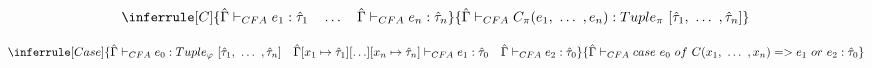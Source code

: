 \documentclass{article}
\begin{document}
\bigskip

\[
\inferrule[C]
{\hat{\Gamma} \vdash_{CFA} e_1 : \hat{\tau}_1 \quad \ldots \quad \hat{\Gamma} \vdash_{CFA} e_n : \hat{\tau}_n}
{\hat{\Gamma} \vdash_{CFA} C_\pi(e_1,\ \ldots\ , e_n) : Tuple_\pi\ [\hat{\tau}_1,\ \ldots\ , \hat{\tau}_n]}
\]

\bigskip

\[
\inferrule[Case]
{\hat{\Gamma} \vdash_{CFA} e_0 : Tuple_\varphi\ [\hat{\tau}_1,\ \ldots\ , \hat{\tau}_n] \quad \hat{\Gamma}[x_1 \mapsto \hat{\tau}_1][\ldots][x_n \mapsto \hat{\tau}_n] \vdash_{CFA} e_1 : \hat{\tau}_0 \quad \hat{\Gamma} \vdash_{CFA} e_2 : \hat{\tau}_0}
{\hat{\Gamma} \vdash_{CFA} case\ e_0\ of\ C(x_1,\ \ldots\ , x_n) => e_1\ or\ e_2 : \hat{\tau}_0}
\]
\end{document}
